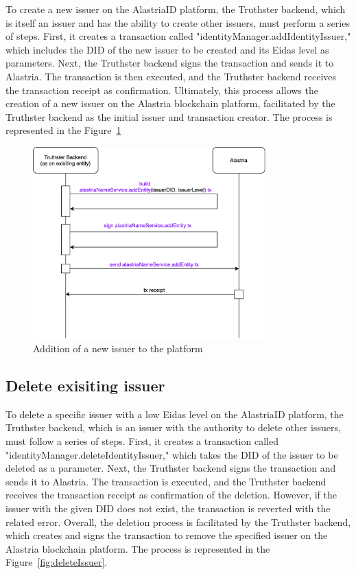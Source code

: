 \documentclass[target=mst,aauheader=]{thud}
\begin{document}
To create a new issuer on the AlastriaID platform, the Truthster backend, which is itself an issuer and has the ability to create other issuers, must perform a series of steps. First, it creates a transaction called "identityManager.addIdentityIssuer," which includes the DID of the new issuer to be created and its Eidas level as parameters. Next, the Truthster backend signs the transaction and sends it to Alastria. The transaction is then executed, and the Truthster backend receives the transaction receipt as confirmation. Ultimately, this process allows the creation of a new issuer on the Alastria blockchain platform, facilitated by the Truthster backend as the initial issuer and transaction creator.
The process is represented in the Figure~\ref{fig:addNewIssuer}

\begin{figure}
    \centering
    \includegraphics[width=0.8\textwidth]{images/addNewIssuer.png}
    \caption{Addition of a new issuer to the platform}
    \label{fig:addNewIssuer}
\end{figure}

\subsection{Delete exisiting issuer}

To delete a specific issuer with a low Eidas level on the AlastriaID platform, the Truthster backend, which is an issuer with the authority to delete other issuers, must follow a series of steps. First, it creates a transaction called "identityManager.deleteIdentityIssuer," which takes the DID of the issuer to be deleted as a parameter. Next, the Truthster backend signs the transaction and sends it to Alastria. The transaction is executed, and the Truthster backend receives the transaction receipt as confirmation of the deletion. However, if the issuer with the given DID does not exist, the transaction is reverted with the related error. Overall, the deletion process is facilitated by the Truthster backend, which creates and signs the transaction to remove the specified issuer on the Alastria blockchain platform.
The process is represented in the Figure~\ref{fig:deleteIssuer}.
\end{document}
